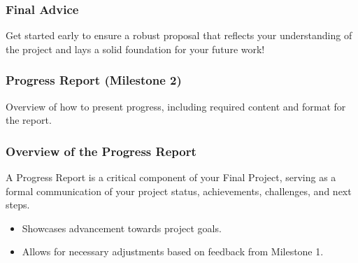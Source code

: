 \documentclass{beamer}
\begin{document}
\begin{frame}[fragile]
    \frametitle{Final Advice}
    \begin{block}{}
        Get started early to ensure a robust proposal that reflects your understanding of the project and lays a solid foundation for your future work!
    \end{block}
\end{frame}

\begin{frame}[fragile]
    \frametitle{Progress Report (Milestone 2)}
    Overview of how to present progress, including required content and format for the report.
\end{frame}

\begin{frame}[fragile]
    \frametitle{Overview of the Progress Report}
    A Progress Report is a critical component of your Final Project, serving as a formal communication of your project status, achievements, challenges, and next steps. 
    \begin{itemize}
        \item Showcases advancement towards project goals.
        \item Allows for necessary adjustments based on feedback from Milestone 1.
    \end{itemize}
\end{frame}
\end{document}
